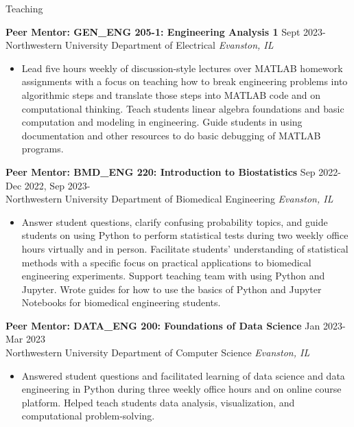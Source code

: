 \documentclass{resume} %
\begin{document}

\begin{rSection}{Teaching}

\textbf{Peer Mentor: GEN\_ENG 205-1: Engineering Analysis 1} \hfill Sept 2023-\\
Northwestern University Department of Electrical \hfill \textit{Evanston, IL}
 \begin{itemize}
    \itemsep -3pt {}
        \item[] Lead five hours weekly of discussion-style lectures over MATLAB homework assignments with a focus on teaching how to break engineering problems into algorithmic steps and translate those steps into MATLAB code and on computational thinking.
        Teach students linear algebra foundations and basic computation and modeling in engineering.
        Guide students in using documentation and other resources to do basic debugging of MATLAB programs.
 \end{itemize}
 
\textbf{Peer Mentor: BMD\_ENG 220: Introduction to Biostatistics} \hfill Sep 2022-Dec 2022, Sep 2023-\\
Northwestern University Department of Biomedical Engineering \hfill \textit{Evanston, IL}
 \begin{itemize}
    \itemsep -3pt {} 
    \item[] Answer student questions, clarify confusing probability topics, and guide students on using Python to perform statistical tests during two weekly office hours virtually and in person.
    Facilitate students' understanding of statistical methods with a specific focus on practical applications to biomedical engineering experiments.
    Support teaching team with using Python and Jupyter.
    Wrote guides for how to use the basics of Python and Jupyter Notebooks for biomedical engineering students.
 \end{itemize}

\textbf{Peer Mentor: DATA\_ENG 200: Foundations of Data Science} \hfill Jan 2023-Mar 2023\\
Northwestern University Department of Computer Science \hfill \textit{Evanston, IL}
 \begin{itemize}
    \itemsep -3pt {}
        \item[] Answered student questions and facilitated learning of data science and data engineering in Python during three weekly office hours and on online course platform.
        Helped teach students data analysis, visualization, and computational problem-solving.
 \end{itemize}

\end{rSection} 
\end{document}
